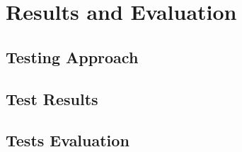\chapter{Results and Evaluation}
\label{chap:res}
 \section {Testing Approach} 
  \section {Test Results} 
  \section {Tests Evaluation} 